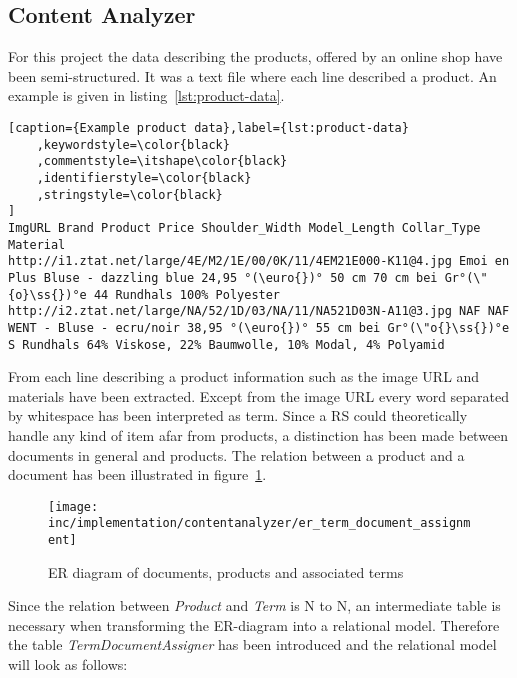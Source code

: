 
\subsection{Content Analyzer}
\label{sec:content-analyzer}
For this project the data describing the products, offered by an online shop have been semi-structured.
It was a text file where each line described a product.
An example is given in listing~\ref{lst:product-data}.

\begin{lstlisting}[caption={Example product data},label={lst:product-data}
    ,keywordstyle=\color{black}
    ,commentstyle=\itshape\color{black}
    ,identifierstyle=\color{black}
    ,stringstyle=\color{black}
]
ImgURL Brand Product Price Shoulder_Width Model_Length Collar_Type Material
http://i1.ztat.net/large/4E/M2/1E/00/0K/11/4EM21E000-K11@4.jpg Emoi en Plus Bluse - dazzling blue 24,95 °(\euro{})° 50 cm 70 cm bei Gr°(\"{o}\ss{})°e 44 Rundhals 100% Polyester
http://i2.ztat.net/large/NA/52/1D/03/NA/11/NA521D03N-A11@3.jpg NAF NAF WENT - Bluse - ecru/noir 38,95 °(\euro{})° 55 cm bei Gr°(\"o{}\ss{})°e S Rundhals 64% Viskose, 22% Baumwolle, 10% Modal, 4% Polyamid
\end{lstlisting}

From each line describing a product information such as the image URL and materials have been extracted.
Except from the image URL every word separated by whitespace has been interpreted as term.
Since a RS could theoretically handle any kind of item afar from products, a distinction has been made between documents in general and products.
The relation between a product and a document has been illustrated in figure~\ref{fig:ertermdocumentassignment}.
\begin{figure}[h]
    \center
    \texttt{[image: inc/implementation/contentanalyzer/er\_term\_document\_assignment]}
    \caption{ER diagram of documents, products and associated terms}
    \label{fig:ertermdocumentassignment}
\end{figure}
Since the relation between \textit{Product} and \textit{Term} is N to N, an intermediate table is necessary when transforming the ER-diagram into a relational model.
Therefore the table \textit{TermDocumentAssigner} has been introduced and the relational model will look as follows:

